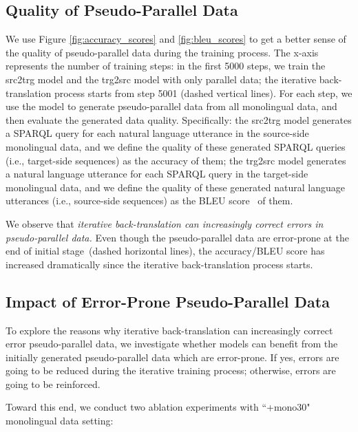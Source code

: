 \documentclass[letterpaper]{article} %
\begin{document}
\subsection{Quality of Pseudo-Parallel Data}
\label{section:quality}

We use Figure \ref{fig:accuracy_scores} and \ref{fig:bleu_scores} to get a better sense of the quality of pseudo-parallel data during the training process.
The x-axis represents the number of training steps: in the first 5000 steps, we train the src2trg model and the trg2src model with only parallel data;
the iterative back-translation process starts from step 5001 (dashed vertical lines).
For each step, we use the model to generate pseudo-parallel data from all monolingual data, and then evaluate the generated data quality.
Specifically:
the src2trg model generates a SPARQL query for each natural language utterance in the source-side monolingual data, and we define the quality of these generated SPARQL queries (i.e., target-side sequences) as the accuracy of them;
the trg2src model generates a natural language utterance for each SPARQL query in the target-side monolingual data, and we define the quality of these generated natural language utterances (i.e., source-side sequences) as the BLEU score~\cite{papineni2002bleu} of them.

We observe that \emph{iterative back-translation can increasingly correct errors in pseudo-parallel data.}
Even though the pseudo-parallel data are error-prone at the end of initial stage~(dashed horizontal lines), the accuracy/BLEU score has increased dramatically since the iterative back-translation process starts.




\subsection{Impact of Error-Prone Pseudo-Parallel Data}
\label{section:static}

To explore the reasons why iterative back-translation can increasingly correct error pseudo-parallel data, we investigate whether models can benefit from the initially generated pseudo-parallel data which are error-prone.
If yes, errors are going to be reduced during the iterative training process;
otherwise, errors are going to be reinforced.

Toward this end, we conduct two ablation experiments with ``+mono30" monolingual data setting:
\end{document}

